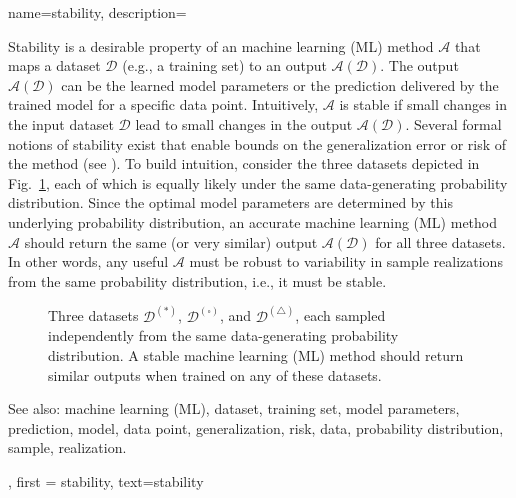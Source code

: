 {name={stability},
	description={
		Stability is a desirable property of an machine learning (ML) method $\mathcal{A}$ that maps a 
		dataset $\mathcal{D}$ (e.g., a training set) to an output $\mathcal{A}(\mathcal{D})$. The output 
		$\mathcal{A}(\mathcal{D})$ can be the learned model parameters or the prediction delivered 
		by the trained model for a specific data point. Intuitively, $\mathcal{A}$ is 
		stable if small changes in the input dataset $\mathcal{D}$ lead to small changes in the 
		output $\mathcal{A}(\mathcal{D})$. Several formal notions of stability exist that enable bounds 
		on the generalization error or risk of the method (see \cite[Ch.~13]{ShalevMLBook}).
		To build intuition, consider the three datasets depicted in Fig.~\ref{fig_three_data_stability}, each 
		of which is equally likely under the same data-generating probability distribution. Since the 
		optimal model parameters are determined by this underlying probability distribution, an accurate 
		machine learning (ML) method $\mathcal{A}$ should return the same (or very similar) output $\mathcal{A}(\mathcal{D})$ 
		for all three datasets. In other words, any useful $\mathcal{A}$ must be robust to 
		variability in sample realizations from the same probability distribution, i.e., it must be stable. 
		\begin{figure}[H]
			\centering
			\caption{Three datasets $\mathcal{D}^{(*)}$, $\mathcal{D}^{(\square)}$, and $\mathcal{D}^{(\triangle)}$, 
				each sampled independently from the same data-generating probability distribution. A stable machine learning (ML) 
				method should return similar outputs when trained on any of these datasets. \label{fig_three_data_stability}}
		\end{figure}
		See also: machine learning (ML), dataset, training set, model parameters, prediction, model, data point, generalization, risk, data, probability distribution, sample, realization.
		}, 
	first = {stability}, text={stability} 
}


